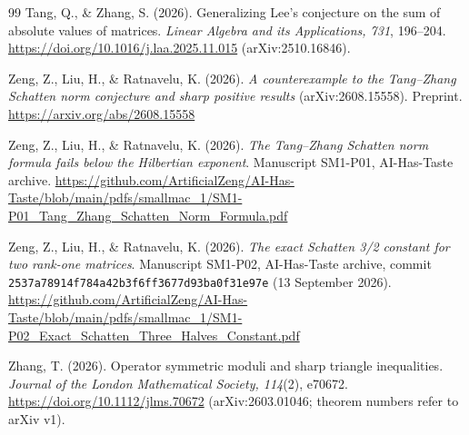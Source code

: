 \documentclass[11pt,a4paper]{article}
\numberwithin{equation}{section}
\theoremstyle{definition}
\theoremstyle{remark}
\begin{document}
\begin{thebibliography}{99}
Tang, Q., \& Zhang, S. (2026).
Generalizing Lee's conjecture on the sum of absolute values of matrices.
\emph{Linear Algebra and its Applications, 731}, 196--204.
\url{https://doi.org/10.1016/j.laa.2025.11.015}
(arXiv:2510.16846).

Zeng, Z., Liu, H., \& Ratnavelu, K. (2026).
\emph{A counterexample to the Tang--Zhang Schatten norm conjecture and
sharp positive results} (arXiv:2608.15558). Preprint.
\url{https://arxiv.org/abs/2608.15558}

Zeng, Z., Liu, H., \& Ratnavelu, K. (2026).
\emph{The Tang--Zhang Schatten norm formula fails below the Hilbertian
exponent}. Manuscript SM1-P01, AI-Has-Taste archive.
\url{https://github.com/ArtificialZeng/AI-Has-Taste/blob/main/pdfs/smallmac_1/SM1-P01_Tang_Zhang_Schatten_Norm_Formula.pdf}

Zeng, Z., Liu, H., \& Ratnavelu, K. (2026).
\emph{The exact Schatten 3/2 constant for two rank-one matrices}.
Manuscript SM1-P02, AI-Has-Taste archive, commit
\texttt{2537a78914f784a42b3f6ff3677d93ba0f31e97e} (13 September 2026).
\url{https://github.com/ArtificialZeng/AI-Has-Taste/blob/main/pdfs/smallmac_1/SM1-P02_Exact_Schatten_Three_Halves_Constant.pdf}

Zhang, T. (2026).
Operator symmetric moduli and sharp triangle inequalities.
\emph{Journal of the London Mathematical Society, 114}(2), e70672.
\url{https://doi.org/10.1112/jlms.70672}
(arXiv:2603.01046; theorem numbers refer to arXiv v1).

\end{thebibliography}
\end{document}
